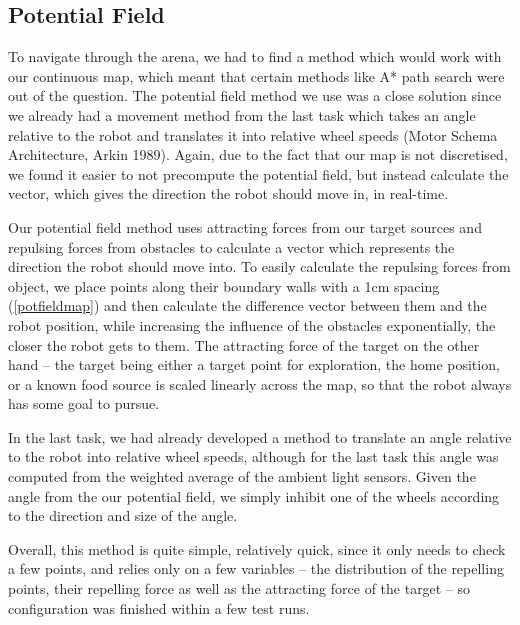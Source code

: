 \documentclass[paper=a4, fontsize=12pt]{scrartcl}	%
\numberwithin{equation}{section}		%
\numberwithin{figure}{section}			%
\numberwithin{table}{section}				%
\begin{document}
\subsection{Potential Field}
To navigate through the arena, we had to find a method which would work with our continuous map, which meant that certain methods like A* path search were out of the question. The potential field method we use was a close solution since we already had a movement method from the last task which takes an angle relative to the robot and translates it into relative wheel speeds (Motor Schema Architecture, Arkin 1989). Again, due to the fact that our map is not discretised, we found it easier to not precompute the potential field, but instead calculate the vector, which gives the direction the robot should move in, in real-time.

Our potential field method uses attracting forces from our target sources and repulsing forces from obstacles to calculate a vector which represents the direction the robot should move into. To easily calculate the repulsing forces from object, we place points along their boundary walls with a 1cm spacing (\ref{potfieldmap}) and then calculate the difference vector between them and the robot position, while increasing the influence of the obstacles exponentially, the closer the robot gets to them. The attracting force of the target on the other hand – the target being either a target point for exploration, the home position, or a known food source \textendash is scaled linearly across the map, so that the robot always has some goal to pursue. 

In the last task, we had already developed a method to translate an angle relative to the robot into relative wheel speeds, although for the last task this angle was computed from the weighted average of the ambient light sensors. Given the angle from the our potential field, we simply inhibit one of the wheels according to the direction and size of the angle.

Overall, this method is quite simple, relatively quick, since it only needs to check a few points, and relies only on a few variables – the distribution of the repelling points, their repelling force as well as the attracting force of the target – so configuration was finished within a few test runs.
\end{document}
